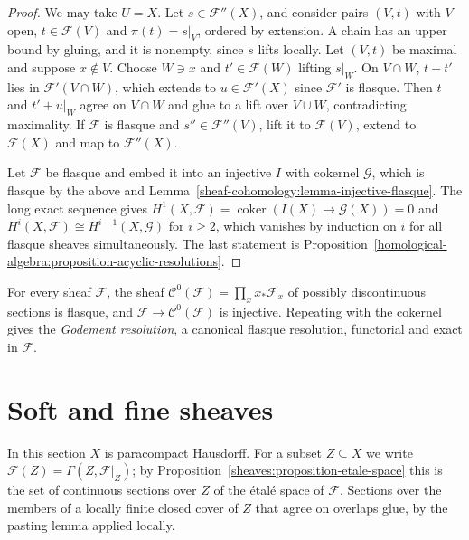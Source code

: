 \begin{proof}
We may take $U = X$. Let $s \in \mathcal{F}''(X)$, and consider pairs $(V, t)$ with $V$ open, $t \in \mathcal{F}(V)$ and $\pi(t) = s|_V$, ordered by extension. A chain has an upper bound by gluing,
and it is nonempty, since $s$ lifts locally. Let $(V, t)$ be maximal and suppose $x \notin V$. Choose $W \ni x$ and $t' \in \mathcal{F}(W)$ lifting $s|_W$. On $V \cap W$, $t - t'$ lies in
$\mathcal{F}'(V \cap W)$, which extends to $u \in \mathcal{F}'(X)$ since $\mathcal{F}'$ is flasque. Then $t$ and $t' + u|_W$ agree on $V \cap W$ and glue to a lift over $V \cup W$, contradicting
maximality. If $\mathcal{F}$ is flasque and $s'' \in \mathcal{F}''(V)$, lift it to $\mathcal{F}(V)$, extend to $\mathcal{F}(X)$ and map to $\mathcal{F}''(X)$.

Let $\mathcal{F}$ be flasque and embed it into an injective $I$ with cokernel $\mathcal{G}$, which is flasque by the above and Lemma~\ref{sheaf-cohomology:lemma-injective-flasque}.
The long exact sequence gives $H^1(X, \mathcal{F}) = \operatorname{coker}(I(X) \to \mathcal{G}(X)) = 0$ and $H^i(X, \mathcal{F}) \cong H^{i-1}(X, \mathcal{G})$ for $i \geq 2$, which vanishes by
induction on $i$ for all flasque sheaves simultaneously. The last statement is Proposition~\ref{homological-algebra:proposition-acyclic-resolutions}.
\end{proof}

\begin{example}\label{sheaf-cohomology:example-godement}
For every sheaf $\mathcal{F}$, the sheaf $\mathcal{C}^0(\mathcal{F}) = \prod_x x_*\mathcal{F}_x$ of possibly discontinuous sections is flasque, and $\mathcal{F} \to \mathcal{C}^0(\mathcal{F})$ is
injective. Repeating with the cokernel gives the \emph{Godement resolution}, a canonical flasque resolution, functorial and exact in $\mathcal{F}$.
\end{example}

\section{Soft and fine sheaves}\label{sheaf-cohomology:section-soft}

In this section $X$ is paracompact Hausdorff. For a subset $Z \subseteq X$ we write $\mathcal{F}(Z) = \Gamma(Z, \mathcal{F}|_Z)$; by Proposition~\ref{sheaves:proposition-etale-space}
this is the set of continuous sections over $Z$ of the \'etal\'e space of $\mathcal{F}$. Sections over the members of a locally finite closed cover of $Z$ that agree on overlaps
glue, by the pasting lemma applied locally.

